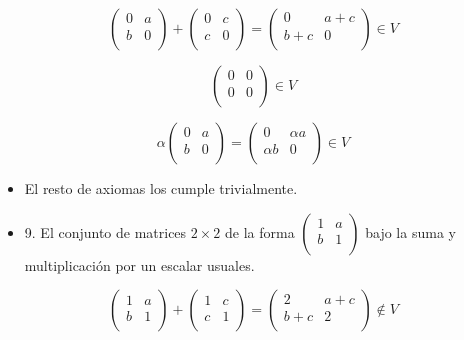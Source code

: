 \documentclass[
]{article}
\begin{document}
\[\begin{pmatrix}
0 & a \\
b & 0 \\
\end{pmatrix} + \begin{pmatrix}
0 & c \\
c & 0 \\
\end{pmatrix} = \begin{pmatrix}
0 & a + c \\
b + c & 0 \\
\end{pmatrix} \in V\]

\[\begin{pmatrix}
0 & 0 \\
0 & 0 \\
\end{pmatrix} \in V\]

\[\alpha\begin{pmatrix}
0 & a \\
b & 0 \\
\end{pmatrix} = \begin{pmatrix}
0 & \alpha a \\
\alpha b & 0 \\
\end{pmatrix} \in V\]

\begin{itemize}
\item
  El resto de axiomas los cumple trivialmente.
\end{itemize}

\begin{itemize}
\item
  9. El conjunto de matrices \(2 \times 2\) de la forma
  \(\begin{pmatrix}
  1 & a \\
  b & 1 \\
  \end{pmatrix}\) bajo la suma y multiplicación por un escalar usuales.
\end{itemize}

\[\begin{pmatrix}
1 & a \\
b & 1 \\
\end{pmatrix} + \begin{pmatrix}
1 & c \\
c & 1 \\
\end{pmatrix} = \begin{pmatrix}
2 & a + c \\
b + c & 2 \\
\end{pmatrix} \notin V\]
\end{document}
